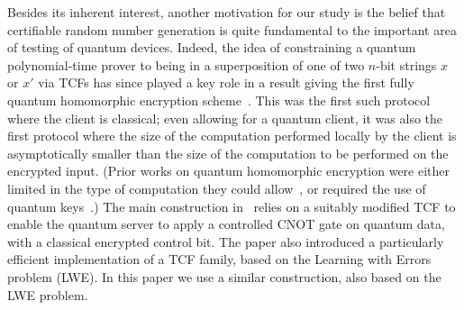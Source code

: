 \documentclass[11pt]{article}
\theoremstyle{remark}
\theoremstyle{definition}
\begin{document}
Besides its inherent interest, another motivation for our study is the belief that  certifiable random number generation  is quite fundamental to the important area 
of testing of quantum devices. Indeed, the idea of constraining a quantum polynomial-time prover to being in a superposition of one of two $n$-bit strings $x$ or $x'$ via TCFs has since played a key role in a result giving the first fully quantum homomorphic encryption scheme~\cite{mahadev2017classical}. This was the first such protocol where the client is classical; even allowing for a quantum client, it was also the first protocol where the size of the computation performed locally by the client is asymptotically smaller than the size of the computation to be performed on the encrypted input. (Prior works on quantum homomorphic encryption were either limited in the type of computation they could allow~\cite{broadbent2015quantum}, or required the use of quantum keys~\cite{dulek2016quantum}.) The main construction in~\cite{mahadev2017classical} relies on a
suitably modified TCF to enable the quantum server to apply a controlled CNOT gate on quantum data, with a classical encrypted control bit. The paper also 
introduced a particularly efficient implementation of a TCF family, based on the Learning with Errors problem (LWE). In this paper we use a similar construction, also based on the LWE problem. 
 
\medskip
\end{document}
